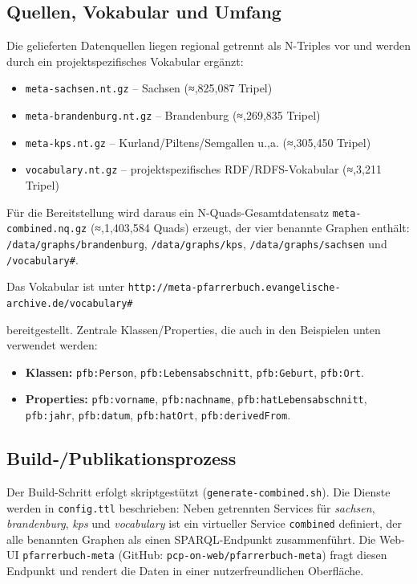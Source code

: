 \subsection{Quellen, Vokabular und Umfang}
Die gelieferten Datenquellen liegen regional getrennt als N-Triples vor und werden durch ein projektspezifisches Vokabular ergänzt:
\begin{itemize}
\item \texttt{meta-sachsen.nt.gz} – Sachsen (≈,825{,}087 Tripel)
\item \texttt{meta-brandenburg.nt.gz} – Brandenburg (≈,269{,}835 Tripel)
\item \texttt{meta-kps.nt.gz} – Kurland/Piltens/Semgallen u.,a. (≈,305{,}450 Tripel)
\item \texttt{vocabulary.nt.gz} – projektspezifisches RDF/RDFS-Vokabular (≈,3{,}211 Tripel)
\end{itemize}
Für die Bereitstellung wird daraus ein N-Quads-Gesamtdatensatz \texttt{meta-combined.nq.gz} (≈,1{,}403{,}584 Quads) erzeugt, der vier benannte Graphen enthält:
\texttt{/data/graphs/brandenburg}, \texttt{/data/graphs/kps}, \texttt{/data/graphs/sachsen} und \texttt{/vocabulary#}.

Das Vokabular ist unter
\texttt{http://meta-pfarrerbuch.evangelische-archive.de/vocabulary\#}

bereitgestellt. Zentrale Klassen/Properties, die auch in den Beispielen unten verwendet werden:
\begin{itemize}
\item \textbf{Klassen:} \texttt{pfb:Person}, \texttt{pfb:Lebensabschnitt}, \texttt{pfb:Geburt}, \texttt{pfb:Ort}.
\item \textbf{Properties:} \texttt{pfb:vorname}, \texttt{pfb:nachname}, \texttt{pfb:hatLebensabschnitt}, \texttt{pfb:jahr}, \texttt{pfb:datum}, \texttt{pfb:hatOrt}, \texttt{pfb:derivedFrom}.
\end{itemize}

\subsection{Build‐/Publikationsprozess}
Der Build-Schritt erfolgt skriptgestützt (\texttt{generate-combined.sh}). Die Dienste werden in \texttt{config.ttl} beschrieben: Neben getrennten Services für \emph{sachsen}, \emph{brandenburg}, \emph{kps} und \emph{vocabulary} ist ein virtueller Service \texttt{combined} definiert, der alle benannten Graphen als einen SPARQL-Endpunkt zusammenführt. Die Web-UI \texttt{pfarrerbuch-meta} (GitHub: \texttt{pcp-on-web/pfarrerbuch-meta}) fragt diesen Endpunkt und rendert die Daten in einer nutzerfreundlichen Oberfläche.

